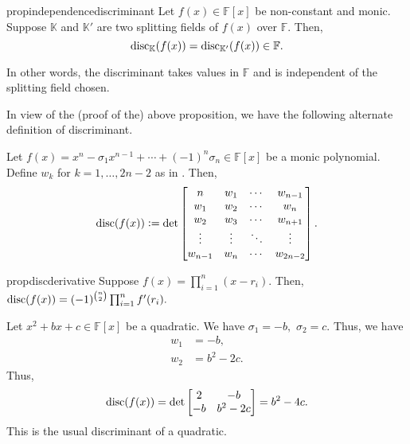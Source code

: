 \begin{restatable}[]{prop}{independencediscriminant}
\label{prop:independencediscriminant}
    Let $f(x) \in \mathbb{F}[x]$ be non-constant and monic. Suppose $\mathbb{K}$ and $\mathbb{K}'$ are two splitting fields of $f(x)$ over $\mathbb{F}.$ Then,
    \begin{equation*} 
        \operatorname{disc}_{\mathbb{K}}(f(x)) = \operatorname{disc}_{\mathbb{K}'}(f(x)) \in \mathbb{F}.
    \end{equation*} 

    In other words, the discriminant takes values in $\mathbb{F}$ and is independent of the splitting field chosen. \hfill\hyperref[prop:independencediscriminant2]{\downsym}
\end{restatable}

In view of the (proof of the) above proposition, we have the following alternate definition of discriminant.

\begin{defn}%
    Let $f(x) = x^n - \sigma_1x^{n - 1} + \cdots + (-1)^n\sigma_n \in \mathbb{F}[x]$ be a monic polynomial. Define $w_k$ for $k = 1, \ldots, 2n - 2$ as in . Then, 
    \begin{equation*} 
        \operatorname{disc}(f(x)) \vcentcolon= \det \begin{bmatrix}
            n & w_1 & \cdots & w_{n - 1}\\
            w_1 & w_2 & \cdots & w_n\\
            w_2 & w_3 & \cdots & w_{n + 1}\\
            \vdots & \vdots & \ddots & \vdots \\
            w_{n - 1} & w_n & \cdots & w_{2n - 2}\\
        \end{bmatrix}.
    \end{equation*}
\end{defn}

\begin{restatable}{prop}{discderivative}
\label{prop:discderivative}
    Suppose $f(x) = \prod_{i = 1}^{n}(x - r_i).$ Then, $\operatorname{disc}(f(x)) = (-1)^{\binom{n}{2}}\prod_{i = 1}^{n}f'(r_i).$ \hfill\hyperref[prop:discderivative2]{\downsym}
\end{restatable}

\begin{ex}
    Let $x^2 + bx + c \in \mathbb{F}[x]$ be a quadratic. We have $\sigma_1 = -b,$ $\sigma_2 = c.$ Thus, we have
    \begin{align*} 
        w_1 &= -b,\\
        w_2 &= b^2 - 2c.
    \end{align*}
    Thus,
    \begin{equation*} 
        \operatorname{disc}(f(x)) = \det\begin{bmatrix}
            2 & -b\\
            -b & b^2 - 2c
        \end{bmatrix} = b^2 - 4c.
    \end{equation*}
    This is the usual discriminant of a quadratic.
\end{ex}


